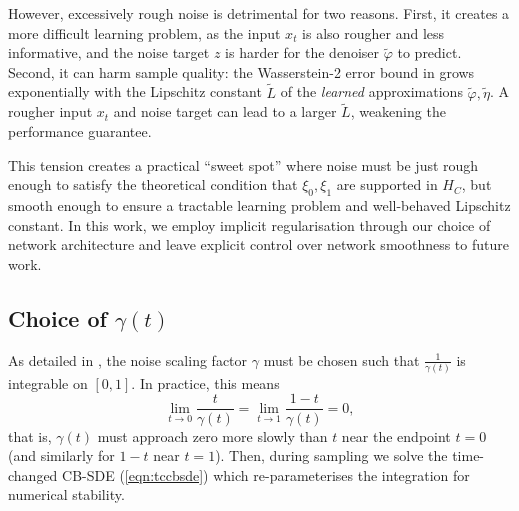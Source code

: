 However, excessively rough noise is detrimental for two reasons. First, it creates a more difficult learning problem, as the input \(x_{t}\) is also rougher and less informative, and the noise target \(z\) is harder for the denoiser \(\widetilde{\varphi}\) to predict. Second, it can harm sample quality: the Wasserstein-2 error bound in  grows exponentially with the Lipschitz constant \(\widetilde{L}\) of the \textit{learned} approximations \(\widetilde{\varphi}, \widetilde{\eta}\). A rougher input \(x_{t}\) and noise target can lead to a larger \(\widetilde{L}\), weakening the performance guarantee.

This tension creates a practical ``sweet spot'' where noise must be just rough enough to satisfy the theoretical condition that \(\xi_{0}, \xi_{1}\) are supported in \(H_{C}\), but smooth enough to ensure a tractable learning problem and well-behaved Lipschitz constant. In this work, we employ implicit regularisation through our choice of network architecture and leave explicit control over network smoothness to future work.

\subsection{Choice of \(\gamma(t)\)}
As detailed in , the noise scaling factor \(\gamma\) must be chosen such that \(\frac{1}{\gamma(t)}\) is integrable on \([0 ,1]\). In practice, this means
\begin{equation}
  \lim\limits_{t \to 0} \frac{t}{\gamma(t)} = \lim\limits_{t \to 1} \frac{1-t}{\gamma(t)} = 0,\label{eqn:integrability}
\end{equation}
that is, \(\gamma(t)\) must approach zero more slowly than \(t\) near the endpoint \(t=0\) (and similarly for \(1-t\) near \(t=1\)). Then, during sampling we solve the time-changed CB-SDE (\ref{eqn:tccbsde}) which re-parameterises the integration for numerical stability. %


